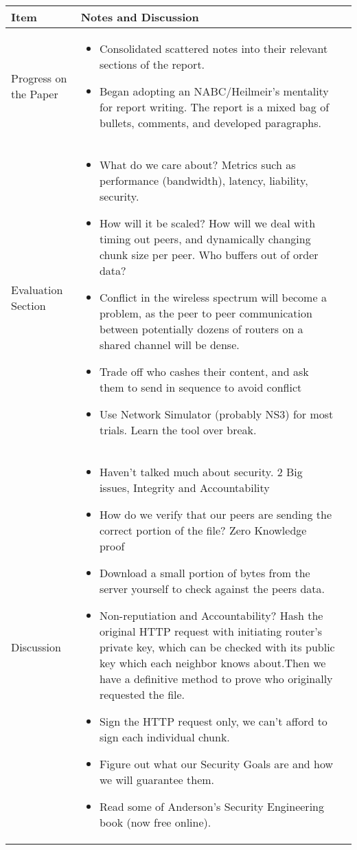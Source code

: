 \documentclass[a4wide,10pt]{extarticle}
\begin{document}
\vspace{0.5cm}
\begin{center}
\begin{tabular}{| m{3.0cm} | m{12.6cm} | m{2cm}|} \hline
\textbf{Item} & \textbf{Notes and Discussion}\\ \hline

Progress on the Paper & 
	\begin{itemize}
		\item Consolidated scattered notes into their relevant sections of the report.
		\item Began adopting an NABC/Heilmeir's mentality for report writing. The report is a mixed bag of bullets, comments, and developed paragraphs.
	\end{itemize} 
\\ \hline
Evaluation Section &
	\begin{itemize}
		\item What do we care about? Metrics such as performance (bandwidth), latency, liability, security. 
		\item How will it be scaled? How will we deal with timing out peers, and dynamically changing chunk size per peer. Who buffers out of order data?
		\item Conflict in the wireless spectrum will become a problem, as the peer to peer communication between potentially dozens of routers on a shared channel will be dense.
		\item Trade off who cashes their content, and ask them to send in sequence to avoid conflict
		\item Use Network Simulator (probably NS3) for most trials. Learn the tool over break.
	\end{itemize}
\\ \hline
Discussion &
	\begin{itemize}
		\item Haven't talked much about security. 2 Big issues, Integrity and Accountability
		\item How do we verify that our peers are sending the correct portion of the file? Zero Knowledge proof
		\item Download a small portion of bytes from the server yourself to check against the peers data.
		\item Non-reputiation and Accountability? Hash the original HTTP request with initiating router's private key, which can be checked with its public key which each neighbor knows about.Then we have a definitive method to prove who originally requested the file.
		\item Sign the HTTP request only, we can't afford to sign each individual chunk.
		\item Figure out what our Security Goals are and how we will guarantee them.
		\item Read some of Anderson's Security Engineering book (now free online).
	\end{itemize}
\\ \hline


\end{tabular}
\end{center}
\end{document}

